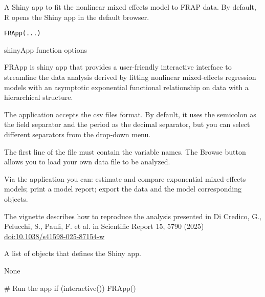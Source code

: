 \documentclass[a4paper]{book}
\begin{document}
%
\begin{Description}
A Shiny app to fit the nonlinear mixed effects model to FRAP data. By default,
R opens the Shiny app in the default browser.
\end{Description}
%
\begin{Usage}
\begin{verbatim}
FRApp(...)
\end{verbatim}
\end{Usage}
%
\begin{Arguments}
\begin{ldescription}
\item[\code{...}] shinyApp function options
\end{ldescription}
\end{Arguments}
%
\begin{Details}
FRApp is shiny app that provides a user-friendly interactive interface to
streamline the data analysis derived by fitting nonlinear mixed-effects
regression models with an asymptotic exponential functional relationship
on data with a hierarchical structure.

The application accepts the csv files format. By default, it uses the
semicolon as the field separator and the period as the decimal separator,
but you can select different separators from the drop-down menu.

The first line of the file must contain the variable names.
The Browse button allows you to load your own data file to be analyzed.

Via the application you can: estimate and compare exponential mixed-effects
models; print a model report; export the data and the model corresponding
objects.

The vignette describes how to reproduce the analysis presented in
Di Credico, G., Pelucchi, S., Pauli, F. et al. in Scientific Report
15, 5790 (2025) \url{doi:10.1038/s41598-025-87154-w}
\end{Details}
%
\begin{Value}
A list of objects that defines the Shiny app.

None
\end{Value}
%
\begin{Examples}
\begin{ExampleCode}
# Run the app
if (interactive()) {
  FRApp()
}

\end{ExampleCode}
\end{Examples}
\printindex{}
\end{document}
